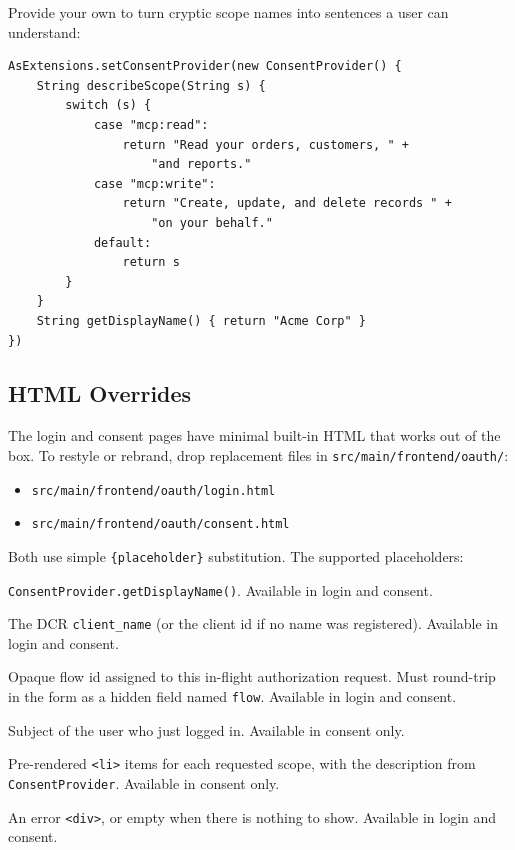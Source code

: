\noindent
Provide your own to turn cryptic scope names into sentences a user can understand:

\begin{lstlisting}[style=groovy]
AsExtensions.setConsentProvider(new ConsentProvider() {
    String describeScope(String s) {
        switch (s) {
            case "mcp:read":
                return "Read your orders, customers, " +
                    "and reports."
            case "mcp:write":
                return "Create, update, and delete records " +
                    "on your behalf."
            default:
                return s
        }
    }
    String getDisplayName() { return "Acme Corp" }
})
\end{lstlisting}

\subsection{HTML Overrides}

The login and consent pages have minimal built-in HTML that works out of the box.  To restyle or rebrand, drop replacement files in \texttt{src/main/front\-end/oauth/}:

\begin{itemize}
  \item \texttt{src/main/frontend/oauth/login.html}
  \item \texttt{src/main/frontend/oauth/consent.html}
\end{itemize}

\noindent
Both use simple \texttt{\{placeholder\}} substitution.  The supported placeholders:

\begin{description}[style=nextline]
  \item[\texttt{\{asName\}}]  \texttt{ConsentProvider.getDisplayName()}.  Available in login and consent.
  \item[\texttt{\{clientName\}}]  The DCR \texttt{client\_name} (or the client id if no name was registered).  Available in login and consent.
  \item[\texttt{\{flowId\}}]  Opaque flow id assigned to this in-flight authorization request.  Must round-trip in the form as a hidden field named \texttt{flow}.  Available in login and consent.
  \item[\texttt{\{userSubject\}}]  Subject of the user who just logged in.  Available in consent only.
  \item[\texttt{\{scopeList\}}]  Pre-rendered \texttt{<li>} items for each requested scope, with the description from \texttt{ConsentProvider}.  Available in consent only.
  \item[\texttt{\{errorBlock\}}]  An error \texttt{<div>}, or empty when there is nothing to show.  Available in login and consent.
\end{description}


